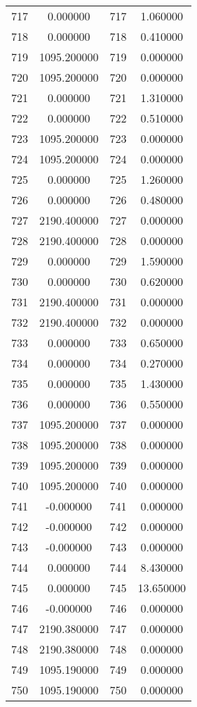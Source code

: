 \documentclass[12pt]{article}
\begin{document}
\begin{longtable}{@{}cccc@{}}
717 & 0.000000 & 717 & 1.060000 \\
718 & 0.000000 & 718 & 0.410000 \\
719 & 1095.200000 & 719 & 0.000000 \\
720 & 1095.200000 & 720 & 0.000000 \\
721 & 0.000000 & 721 & 1.310000 \\
722 & 0.000000 & 722 & 0.510000 \\
723 & 1095.200000 & 723 & 0.000000 \\
724 & 1095.200000 & 724 & 0.000000 \\
725 & 0.000000 & 725 & 1.260000 \\
726 & 0.000000 & 726 & 0.480000 \\
727 & 2190.400000 & 727 & 0.000000 \\
728 & 2190.400000 & 728 & 0.000000 \\
729 & 0.000000 & 729 & 1.590000 \\
730 & 0.000000 & 730 & 0.620000 \\
731 & 2190.400000 & 731 & 0.000000 \\
732 & 2190.400000 & 732 & 0.000000 \\
733 & 0.000000 & 733 & 0.650000 \\
734 & 0.000000 & 734 & 0.270000 \\
735 & 0.000000 & 735 & 1.430000 \\
736 & 0.000000 & 736 & 0.550000 \\
737 & 1095.200000 & 737 & 0.000000 \\
738 & 1095.200000 & 738 & 0.000000 \\
739 & 1095.200000 & 739 & 0.000000 \\
740 & 1095.200000 & 740 & 0.000000 \\
741 & -0.000000 & 741 & 0.000000 \\
742 & -0.000000 & 742 & 0.000000 \\
743 & -0.000000 & 743 & 0.000000 \\
744 & 0.000000 & 744 & 8.430000 \\
745 & 0.000000 & 745 & 13.650000 \\
746 & -0.000000 & 746 & 0.000000 \\
747 & 2190.380000 & 747 & 0.000000 \\
748 & 2190.380000 & 748 & 0.000000 \\
749 & 1095.190000 & 749 & 0.000000 \\
750 & 1095.190000 & 750 & 0.000000 \\

\end{longtable}
\end{document}
